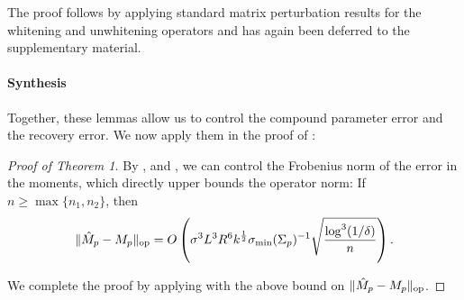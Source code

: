 The proof follows by applying standard matrix perturbation results for
the whitening and unwhitening operators and has again been deferred
to the supplementary material.

\paragraph{Synthesis}
Together, these lemmas allow us to control the compound parameter error
and the recovery error. We now apply them in the proof of
:

\begin{proof}[Proof of Theorem 1]
By ,  and , we
can control the Frobenius norm of the error in the moments, which
directly upper bounds the operator norm: If $n \ge \max\{n_1, n_2\}$,
then
\begin{align}
  \|\hat M_p - M_p\|_{\textrm{op}} = O\left( \sigma^3 L^3 R^6 k^{\frac12} \sigma_\text{\rm min}(\Sigma_p)^{-1} \sqrt{\frac{\log^3 (1/\delta)}{n}} \right).
\end{align}

We complete the proof by applying  with the above
bound on $\|\hat M_p - M_p\|_{\textrm{op}}$.

\end{proof}

